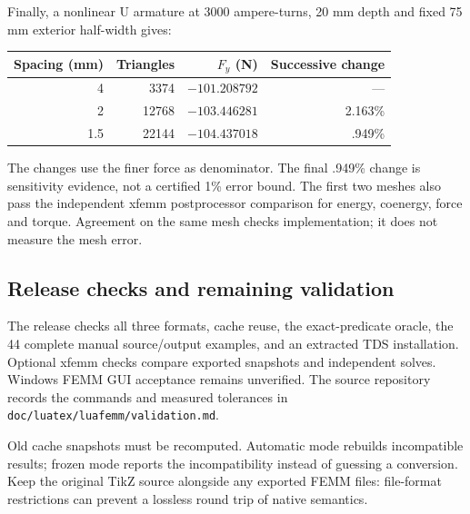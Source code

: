 Finally, a nonlinear U armature at 3000 ampere-turns, 20 mm depth and fixed
75 mm exterior half-width gives:
\begin{center}
\begin{tabular}{rrrr}
\toprule Spacing (mm) & Triangles & $F_y$ (N) & Successive change\\
\midrule
4 & 3374 & $-101.208792$ & ---\\
2 & 12768 & $-103.446281$ & 2.163\%\\
1.5 & 22144 & $-104.437018$ & .949\%\\
\bottomrule
\end{tabular}
\end{center}
The changes use the finer force as denominator. The final .949\% change
is sensitivity evidence, not a certified 1\% error bound. The first two
meshes also pass the independent xfemm postprocessor comparison for energy,
coenergy, force and torque. Agreement on the same mesh checks implementation;
it does not measure the mesh error.

\subsection{Release checks and remaining validation}
The release checks all three formats, cache reuse, the exact-predicate oracle,
the 44 complete manual source/output examples, and an extracted TDS
installation. Optional xfemm checks compare exported snapshots and independent
solves. Windows FEMM GUI acceptance remains unverified. The source repository
records the commands and measured tolerances in
\nolinkurl{doc/luatex/luafemm/validation.md}.

Old cache snapshots must be recomputed. Automatic mode rebuilds incompatible
results; frozen mode reports the incompatibility instead of guessing a
conversion. Keep the original TikZ source alongside any exported FEMM files:
file-format restrictions can prevent a lossless round trip of native semantics.
